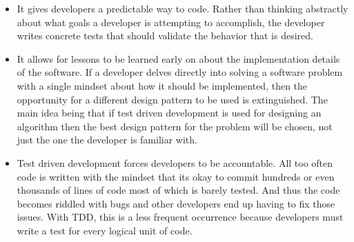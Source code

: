 \begin{itemize}
\item It gives developers a predictable way to code. Rather than thinking
abstractly about what goals a developer is attempting to accomplish, the developer
writes concrete tests that should validate the behavior that is desired.
\item It allows for lessons to be learned early on about the implementation details
of the software. If a developer delves directly into solving a software problem
with a single mindset about how it should be implemented, then the opportunity
for a different design pattern to be used is extinguished. The main idea being
that if test driven development is used for designing an algorithm then the best
design pattern for the problem will be chosen, not just the one the developer
is familiar with.
\item Test driven development forces developers to be accountable. All too often
code is written with the mindset that its okay to commit hundreds or even
thousands of lines of code most of which is barely tested. And thus the code
becomes riddled with bugs and other developers end up having to fix those issues.
With TDD, this is a less frequent occurrence because developers must write a test
for every logical unit of code.
\end{itemize}

